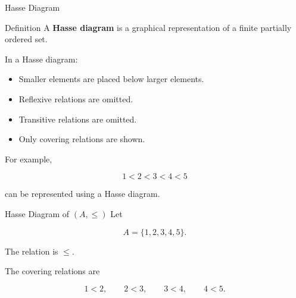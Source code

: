 \documentclass[aspectratio=169]{beamer}
\begin{document}
\begin{frame}{Hasse Diagram}
\begin{block}{Definition}
A \textbf{Hasse diagram} is a graphical representation of a finite partially ordered set.
\end{block}

In a Hasse diagram:

\begin{itemize}
\item Smaller elements are placed below larger elements.
\item Reflexive relations are omitted.
\item Transitive relations are omitted.
\item Only covering relations are shown.
\end{itemize}

For example,

\[
1<2<3<4<5
\]

can be represented using a Hasse diagram.
\end{frame}

\begin{frame}{Hasse Diagram of $(A,\leq)$}
Let

\[
A=\{1,2,3,4,5\}.
\]

The relation is $\leq$.

The covering relations are

\[
1<2,\qquad2<3,\qquad3<4,\qquad4<5.
\]

\begin{center}
\end{center}

\end{frame}
\end{document}
